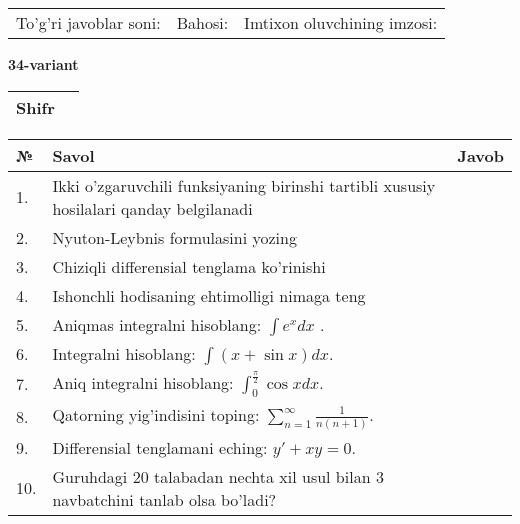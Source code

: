 \documentclass{article}
\begin{document}
  \vspace{1cm}
  
  \begin{tabular}{lll}
  To'g'ri javoblar soni: \underline{\hspace{1.5cm}} & 
  Bahosi: \underline{\hspace{1.5cm}} & 
  Imtixon oluvchining imzosi: \underline{\hspace{2cm}} \\
  \end{tabular}
  
  \egroup
  
  \newpage
  
  
  \textbf{34-variant}\\
  
  \bgroup
  \def\arraystretch{1.6} %
  
  \begin{tabular}{|m{5.7cm}|m{9.5cm}|}
  \hline
  Shifr & \\
  \hline
  \end{tabular}
  
  \vspace{1cm}
  
  \begin{tabular}{|m{0.7cm}|m{10cm}|m{4cm}|}
  \hline
  № & Savol & Javob \\
  \hline
  1. & Ikki o'zgaruvchili funksiyaning birinshi tartibli xususiy hosilalari qanday belgilanadi &  \\
  \hline
  2. & Nyuton-Leybnis formulasini yozing &  \\
  \hline
  3. & Chiziqli differensial tenglama ko'rinishi &  \\
  \hline
  4. & Ishonchli hodisaning ehtimolligi nimaga teng &  \\
  \hline
  5. & Aniqmas integralni hisoblang: \(\int {e^{x}dx}\) . &  \\
  \hline
  6. & Integralni hisoblang: \(\int {(x + \sin x)dx}\). &  \\
  \hline
  7. & Aniq integralni hisoblang: \(\int_{0}^{\frac{\pi}{2}}{\cos xdx}\). &  \\
  \hline
  8. & Qatorning yig'indisini toping: \(\sum_{n = 1}^{\infty}\frac{1}{n(n + 1)}\). &  \\
  \hline
  9. & Differensial tenglamani eching: \(y' + xy = 0\). &  \\
  \hline
  10. & Guruhdagi 20 talabadan nechta xil usul bilan 3 navbatchini tanlab olsa bo'ladi? &  \\
  \hline
  \end{tabular}
  
\end{document}
